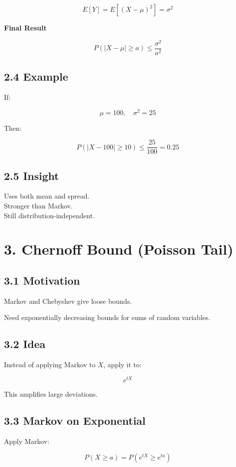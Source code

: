 \documentclass[12pt]{article}
\begin{document}
\[
E[Y] = E[(X - \mu)^2] = \sigma^2
\]

\textbf{Final Result}

\[
P (|X - \mu| \ge a) \le \frac{\sigma^2}{a^2}
\]

\subsection*{2.4 Example}

If:

\[
\mu = 100, \quad \sigma^2 = 25
\]

Then:

\[
P (|X - 100| \ge 10) \le \frac{25}{100} = 0.25
\]

\subsection*{2.5 Insight}

Uses both mean and spread.\\
Stronger than Markov.\\
Still distribution-independent.

\section*{3. Chernoff Bound (Poisson Tail)}

\subsection*{3.1 Motivation}

Markov and Chebyshev give loose bounds.

Need exponentially decreasing bounds for sums of random variables.

\subsection*{3.2 Idea}

Instead of applying Markov to $X$, apply it to:

\[
e^{tX}
\]

This amplifies large deviations.

\subsection*{3.3 Markov on Exponential}

Apply Markov:

\[
P (X \ge a) = P (e^{tX} \ge e^{ta})
\]
\end{document}
